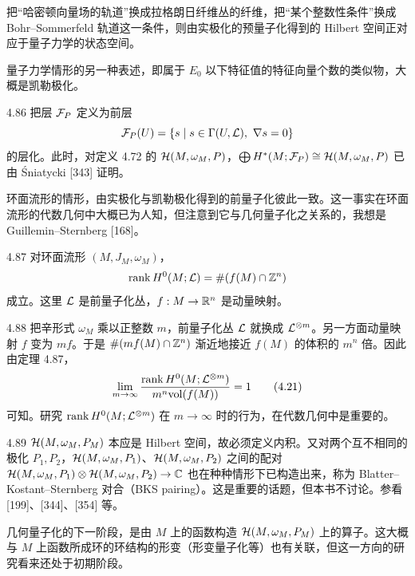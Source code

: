 把“哈密顿向量场的轨道”换成拉格朗日纤维丛的纤维，把“某个整数性条件”换成 Bohr–Sommerfeld 轨道这一条件，则由实极化的预量子化得到的 Hilbert 空间正对应于量子力学的状态空间。

量子力学情形的另一种表述，即属于 $E_0$ 以下特征值的特征向量个数的类似物，大概是凯勒极化。

\begin{remark}{4.86}
  把层 $\mathcal{F}_P$ 定义为前层
  \[
    \mathcal{F}_P(U)=\{s\mid s\in\Gamma(U,\mathcal{L}),\ \nabla s=0\}
  \]
  的层化。此时，对定义 4.72 的 $\mathcal{H}(M,\omega_M,P)$，$\bigoplus H^*(M;\mathcal{F}_P)\cong\mathcal{H}(M,\omega_M,P)$ 已由 Śniatycki [343] 证明。
\end{remark}

环面流形的情形，由实极化与凯勒极化得到的前量子化彼此一致。这一事实在环面流形的代数几何中大概已为人知，但注意到它与几何量子化之关系的，我想是 Guillemin–Sternberg [168]。

\begin{theorem}{4.87}
  对环面流形 $(M,J_M,\omega_M)$，
  \[
    \operatorname{rank} H^0(M;\mathcal{L})=\#(f(M)\cap\mathbb{Z}^n)
  \]
  成立。这里 $\mathcal{L}$ 是前量子化丛，$f:M\to\mathbb{R}^n$ 是动量映射。
\end{theorem}

\begin{remark}{4.88}
  把辛形式 $\omega_M$ 乘以正整数 $m$，前量子化丛 $\mathcal{L}$ 就换成 $\mathcal{L}^{\otimes m}$。另一方面动量映射 $f$ 变为 $mf$。于是 $\#(mf(M)\cap\mathbb{Z}^n)$ 渐近地接近 $f(M)$ 的体积的 $m^n$ 倍。因此由定理 4.87，
  \begin{equation}
    \lim_{m\to\infty}\frac{\operatorname{rank} H^0(M;\mathcal{L}^{\otimes m})}{m^n\mathrm{vol}(f(M))}=1 \tag{4.21}
  \end{equation}
  可知。研究 $\operatorname{rank} H^0(M;\mathcal{L}^{\otimes m})$ 在 $m\to\infty$ 时的行为，在代数几何中是重要的。
\end{remark}

\begin{remark}{4.89}
  $\mathcal{H}(M,\omega_M,P_M)$ 本应是 Hilbert 空间，故必须定义内积。又对两个互不相同的极化 $P_1,P_2$，$\mathcal{H}(M,\omega_M,P_1)$、$\mathcal{H}(M,\omega_M,P_2)$ 之间的配对 $\mathcal{H}(M,\omega_M,P_1)\otimes\mathcal{H}(M,\omega_M,P_2)\to\mathbb{C}$ 也在种种情形下已构造出来，称为 Blatter–Kostant–Sternberg 对合（BKS pairing）。这是重要的话题，但本书不讨论。参看 [199]、[344]、[354] 等。
\end{remark}

几何量子化的下一阶段，是由 $M$ 上的函数构造 $\mathcal{H}(M,\omega_M,P_M)$ 上的算子。这大概与 $M$ 上函数所成环的环结构的形变（形变量子化等）也有关联，但这一方向的研究看来还处于初期阶段。

